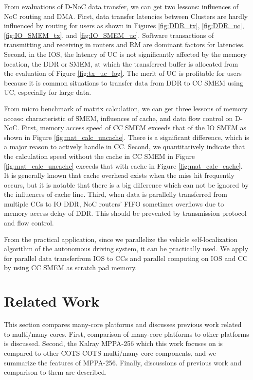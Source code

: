 \documentclass[conference,compsoc]{IEEEtran}
\begin{document}
From evaluations of D-NoC data transfer, we can get two lessons: influences of NoC routing and DMA.
First, data transfer latencies between Clusters are hardly influenced by routing for users as shown in Figures \ref{fig:DDR_tx}, \ref{fig:DDR_uc}, \ref{fig:IO_SMEM_tx}, and \ref{fig:IO_SMEM_uc}.
Software transactions of transmitting and receiving in routers and RM are dominant factors for latencies.
Second, in the IOS, the latency of UC is not significantly affected by the memory location, the DDR or SMEM, at which the transferred buffer is allocated from the evaluation of Figure \ref{fig:tx_uc_log}.
The merit of UC is profitable for users because it is common situations to transfer data from DDR to CC SMEM using UC, especially for large data.

From micro benchmark of matrix calculation, we can get three lessons of memory access: characteristic of SMEM, influences of cache, and data flow control on D-NoC.
First, memory access speed of CC SMEM exceeds that of the IO SMEM as shown in Figure \ref{fig:mat_calc_uncache}.
There is a significant difference, which is a major reason to actively handle in CC.
Second, we quantitatively indicate that the calculation speed without the cache in CC SMEM in Figure \ref{fig:mat_calc_uncache} exceeds that with cache in Figure \ref{fig:mat_calc_cache}.
It is generally known that cache overhead exists when the miss hit frequently occurs, but it is notable that there is a big difference which can not be ignored by the influences of cache line.
Third, when data is parallelly transferred from multiple CCs to IO DDR, NoC routers' FIFO sometimes overflows due to memory access delay of DDR.
This should be prevented by transmission protocol and flow control.

From the practical application, since we parallelize the vehicle self-localization algorithm of the autonomous driving system, it can be practically used.
We apply for parallel data transferfrom IOS to CCs and parallel computing on IOS and CC by using CC SMEM as scratch pad memory.

\vspace{-3mm}
\section{Related Work}
\label{sec:related_work}
\vspace{-3mm}
This section compares many-core platforms and discusses previous work related to multi/many cores.
First, comparison of many-core platforms to other platforms is discussed.
Second, the Kalray MPPA-256 which this work focuses on is compared to other COTS COTS multi/many-core components, and we summarize the features of MPPA-256.
Finally, discussions of previous work and comparison to them are described.
\end{document}
